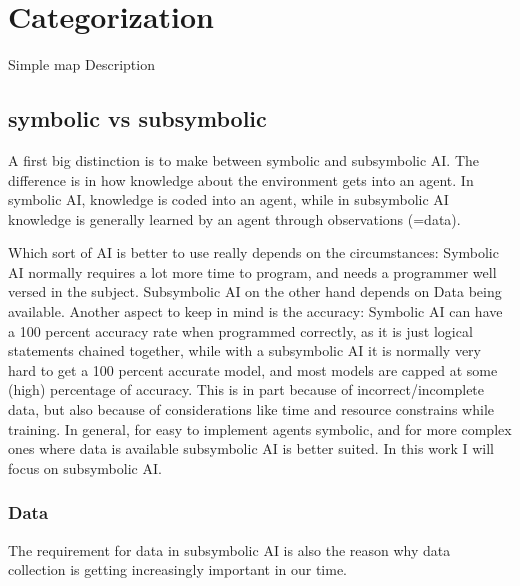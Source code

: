 \chapter{Categorization}
Simple map
Description
\section{symbolic vs subsymbolic}
A first big distinction is to make between symbolic and subsymbolic AI. 
The difference is in how knowledge about the environment gets into an agent. In symbolic AI, knowledge is coded into an agent, while in subsymbolic AI knowledge is generally learned by an agent through observations (=data). 

Which sort of AI is better to use really depends on the circumstances: 
Symbolic AI normally requires a lot more time to program, and needs a programmer well versed in the subject. 
Subsymbolic AI on the other hand depends on Data being available.
Another aspect to keep in mind is the accuracy: Symbolic AI can have a 100 percent accuracy rate when programmed correctly, as it is just logical statements chained together, while with a subsymbolic AI it is normally very hard to get a 100 percent accurate model, and most models are capped at some (high) percentage of accuracy. This is in part because of incorrect/incomplete data, but also because of considerations like time and resource constrains while training.
In general, for easy to implement agents symbolic, and for more complex ones where data is available subsymbolic AI is better suited. In this work I will focus on subsymbolic AI. 
\subsection{Data}
The requirement for data in subsymbolic AI is also the reason why data collection is getting increasingly important in our time. 